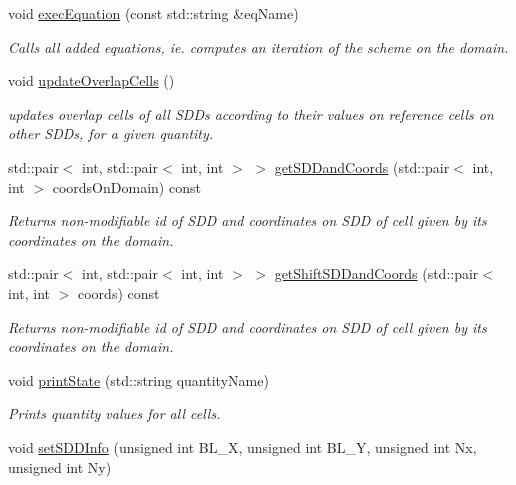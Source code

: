 \begin{DoxyCompactItemize}
\mbox{\label{classDomain_a64d63078e57bc8db65d5bc8ff1ce61b9}} 
void \mbox{\hyperlink{classDomain_a64d63078e57bc8db65d5bc8ff1ce61b9}{exec\+Equation}} (const std\+::string \&eq\+Name)
\begin{DoxyCompactList}\small\item\em Calls all added equations, ie. computes an iteration of the scheme on the domain. \end{DoxyCompactList}\item 
\mbox{\label{classDomain_a4411f8eb6c118c84f16d62a411b4432a}} 
void \mbox{\hyperlink{classDomain_a4411f8eb6c118c84f16d62a411b4432a}{update\+Overlap\+Cells}} ()
\begin{DoxyCompactList}\small\item\em updates overlap cells of all S\+D\+Ds according to their values on reference cells on other S\+D\+Ds, for a given quantity. \end{DoxyCompactList}\item 
std\+::pair$<$ int, std\+::pair$<$ int, int $>$ $>$ \mbox{\hyperlink{classDomain_a5b3fd7cbe29576ea63219b326c15680e}{get\+S\+D\+Dand\+Coords}} (std\+::pair$<$ int, int $>$ coords\+On\+Domain) const
\begin{DoxyCompactList}\small\item\em Returns non-\/modifiable id of S\+DD and coordinates on S\+DD of cell given by its coordinates on the domain. \end{DoxyCompactList}\item 
std\+::pair$<$ int, std\+::pair$<$ int, int $>$ $>$ \mbox{\hyperlink{classDomain_a809070249379cd5a3b223a8ac01bfbdb}{get\+Shift\+S\+D\+Dand\+Coords}} (std\+::pair$<$ int, int $>$ coords) const
\begin{DoxyCompactList}\small\item\em Returns non-\/modifiable id of S\+DD and coordinates on S\+DD of cell given by its coordinates on the domain. \end{DoxyCompactList}\item 
void \mbox{\hyperlink{classDomain_a1163559d75540c4cd29c7aa775feca80}{print\+State}} (std\+::string quantity\+Name)
\begin{DoxyCompactList}\small\item\em Prints quantity values for all cells. \end{DoxyCompactList}\item 
void \mbox{\hyperlink{classDomain_acc1225a3c5e6e2a808c88d187adc7d3c}{set\+S\+D\+D\+Info}} (unsigned int B\+L\+\_\+X, unsigned int B\+L\+\_\+Y, unsigned int Nx, unsigned int Ny)

\end{DoxyCompactItemize}

